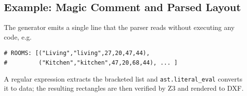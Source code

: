 \documentclass{book}
\begin{document}
\begin{appendices}
\chapter{Example: Magic Comment and Parsed Layout}
The generator emits a single line that the parser reads without executing any code, e.g.
\begin{verbatim}
# ROOMS: [("Living","living",27,20,47,44),
#         ("Kitchen","kitchen",47,20,68,44), ... ]
\end{verbatim}
A regular expression extracts the bracketed list and \texttt{ast.literal\_eval} converts it to data; the resulting rectangles are then verified by Z3 and rendered to DXF.

\end{appendices}
\end{document}
